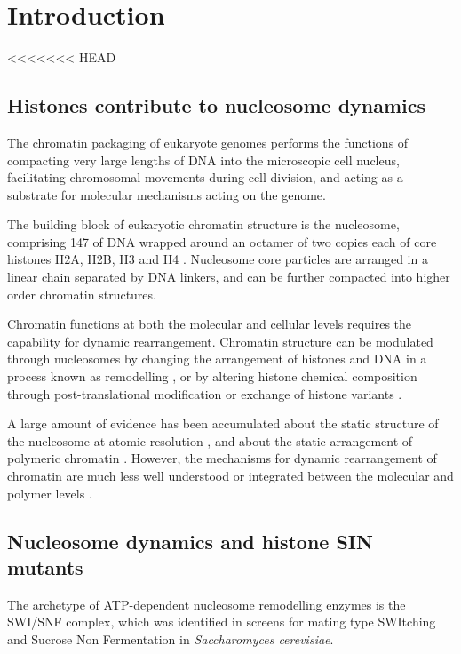 \section{Introduction}

<<<<<<< HEAD
  \subsection{Histones contribute to nucleosome dynamics}

    The chromatin packaging of eukaryote genomes performs the functions of
    compacting very large lengths of DNA into the microscopic cell nucleus,
    facilitating chromosomal movements during cell division,
    and acting as a substrate for molecular mechanisms acting on the genome.

    The building block of eukaryotic chromatin structure is the nucleosome, 
    comprising \SI{147}{\bp} of DNA wrapped around an octamer of two copies each
    of core histones H2A, H2B, H3 and H4 \citep{luger1997crystal}.
    Nucleosome core particles are arranged in a linear chain separated by DNA linkers,
    and can be further compacted into higher order chromatin structures.

    Chromatin functions at both the molecular and cellular levels 
    requires the capability for dynamic rearrangement.
    Chromatin structure can be modulated through nucleosomes
    by changing the arrangement of histones and DNA in a process known as remodelling ,
    or by altering histone chemical composition 
    through post-translational modification  or exchange of histone variants .

    A large amount of evidence has been accumulated about 
    the static structure of the nucleosome at atomic resolution ,
    and about the static arrangement of polymeric chromatin .
    However, the mechanisms for dynamic rearrangement of chromatin
    are much less well understood or integrated between the molecular and polymer levels .

  \subsection{Nucleosome dynamics and histone SIN mutants}

    The archetype of ATP-dependent nucleosome remodelling enzymes is the SWI/SNF complex,
    which was identified in screens for mating type SWItching \citep{SWI-mutants}
    and Sucrose Non Fermentation \citep{SNF-mutants-original-discovery, SNF-mutants2}
    in \textit{Saccharomyces cerevisiae}.

